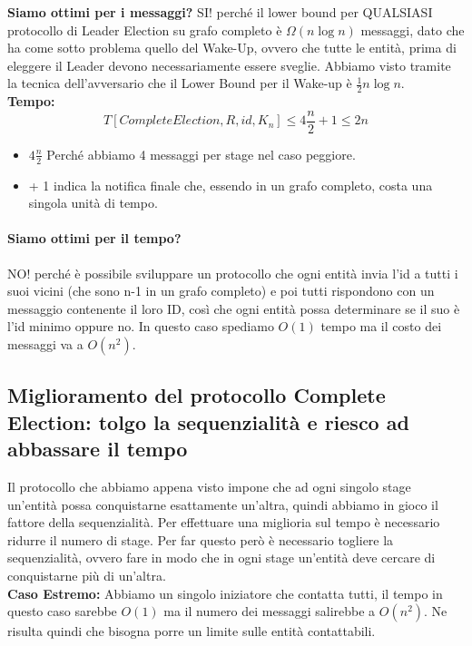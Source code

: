 \textbf{Siamo ottimi per i messaggi?}
SI! perché il lower bound per QUALSIASI protocollo di Leader Election su grafo
completo è $\Omega(n \log n)$ messaggi, dato che ha come sotto problema quello
del Wake-Up, ovvero che tutte le entità, prima di eleggere il Leader devono
necessariamente essere sveglie. Abbiamo visto tramite la tecnica dell'avversario
che il Lower Bound per il Wake-up è $\frac{1}{2}n \log n$.\\


\textbf{Tempo:}\\ $$T[CompleteElection, R, id, K_n] \leq 4 \frac{n}{2} + 1 \leq
    2 n$$
\begin{itemize}
    \item $ 4 \frac{n}{2} $ Perché abbiamo 4 messaggi per stage nel caso peggiore.
    \item + 1 indica la notifica finale che, essendo in un grafo completo, costa
          una singola unità di tempo.
\end{itemize}

\paragraph{Siamo ottimi per il tempo?} NO! perché è possibile sviluppare un
protocollo che ogni entità invia l'id a tutti i suoi vicini (che sono n-1 in un
grafo completo) e poi tutti rispondono con un messaggio contenente il loro ID,
così che ogni entità possa determinare se il suo è l'id minimo oppure no. In
questo caso spediamo $O(1)$ tempo ma il costo dei messaggi va a $O(n^2)$.

\subsection{Miglioramento del protocollo Complete Election: tolgo la sequenzialità e riesco ad abbassare il tempo}
Il protocollo che abbiamo appena visto impone che ad ogni singolo stage
un'entità possa conquistarne esattamente un'altra, quindi abbiamo in gioco il
fattore della sequenzialità. Per effettuare una miglioria sul tempo è necessario
ridurre il numero di stage. Per far questo però è necessario togliere la
sequenzialità, ovvero fare in modo che in ogni stage un'entità deve cercare di
conquistarne più di un'altra.\\

\textbf{Caso Estremo:} Abbiamo un singolo iniziatore che contatta tutti, il
tempo in questo caso sarebbe $O(1)$ ma il numero dei messaggi salirebbe a
$O(n^2)$. Ne risulta quindi che bisogna porre un limite sulle entità
contattabili.\\

